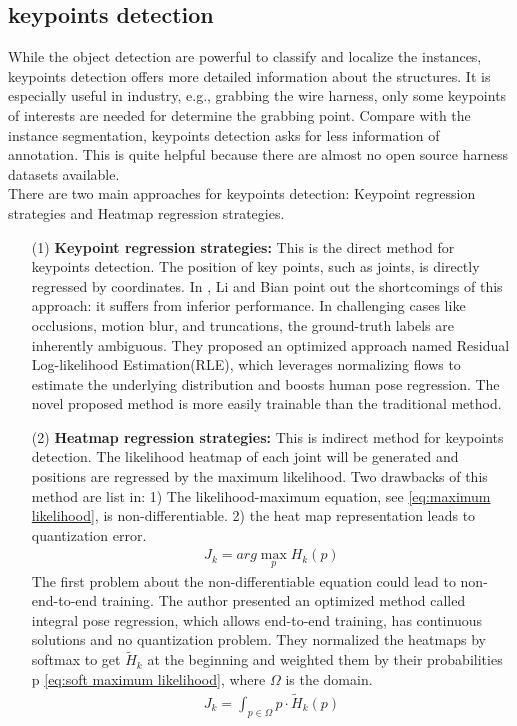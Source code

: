 \subsection{keypoints detection}
    While the object detection are powerful to classify and localize the instances, keypoints detection offers more detailed information about the structures. It is especially
    useful in industry, e.g., grabbing the wire harness, only some keypoints of interests are needed for determine the grabbing point. Compare with the instance segmentation, 
    keypoints detection asks for less information of annotation. This is quite helpful because there are almost no open source harness datasets available.\\
    There are two main approaches for keypoints detection: Keypoint regression strategies and Heatmap regression strategies. 
    \begin{itemize}
        \item [(1)] \textbf{Keypoint regression strategies: } This is the direct method for keypoints detection. The position of key points, such as joints, is directly 
        regressed by coordinates\cite{Toshev_2014_CVPR}. In \cite{9710108}, Li and Bian point out the shortcomings of this approach: it suffers from inferior performance. 
        In challenging cases like occlusions, motion blur, and truncations, the ground-truth labels are inherently ambiguous. They proposed an optimized approach named  
        Residual Log-likelihood Estimation(RLE), which leverages normalizing flows to estimate the underlying distribution and boosts human pose regression. The novel 
        proposed method is more easily trainable than the traditional method.

        \item [(2)] \textbf{Heatmap regression strategies: } This is indirect method for keypoints detection. The likelihood heatmap of each joint will be generated and positions 
        are regressed by the maximum likelihood\cite{10.1007/978-3-319-46484-8_29}. Two drawbacks of this method are list in\cite{Sun_2018_ECCV}: 1) The likelihood-maximum equation, 
        see \autoref{eq:maximum likelihood}, is non-differentiable. 2) the heat map representation leads to quantization error.
        \begin{align}
            J_{k}=arg\max_{p}H_{k} (p)
             \label{eq:maximum likelihood}
        \end{align}
        The first problem about the non-differentiable equation could lead to non-end-to-end training. The author presented an optimized method called integral pose regression, which
        allows end-to-end training, has continuous solutions and no quantization problem. They normalized the heatmaps by softmax to get $\widetilde{H}_{k}$ at the beginning and weighted 
        them by their probabilities p \autoref{eq:soft maximum likelihood}, where $\Omega$ is the domain.\\
        \begin{align}
            J_{k}=\int_{p\in \Omega } p\cdot \widetilde{H}_{k}(p) 
             \label{eq:soft maximum likelihood}
        \end{align}
    \end{itemize}
